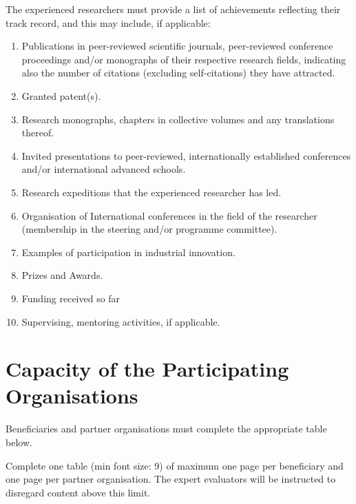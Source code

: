 \documentclass[a4paper,11pt]{article}
\begin{document}
The experienced researchers must provide a list of achievements reflecting their track record, and this may include, if applicable:
\begin{enumerate}
\item Publications in peer-reviewed scientific journals, peer-reviewed conference proceedings and/or monographs of their respective research fields, indicating also the number of citations (excluding self-citations) they have attracted.
\item Granted patent(s).
\item Research monographs, chapters in collective volumes and any translations thereof.
\item Invited presentations to peer-reviewed, internationally established conferences and/or international advanced schools.
\item Research expeditions that the experienced researcher has led.
\item Organisation of International conferences in the field of the researcher (membership in the steering and/or programme committee).
\item Examples of participation in industrial innovation.
\item Prizes and Awards.
\item Funding received so far
\item Supervising, mentoring activities, if applicable.
\end{enumerate}

\newpage

\section{Capacity of the Participating Organisations}
\label{sec:capacities}

Beneficiaries and partner organisations must complete the appropriate table below.

Complete one table (min font size: 9) of maximum one page per beneficiary and one page per partner organisation. The expert evaluators will be instructed to disregard content above this limit.
\vspace{\baselineskip}
\end{document}

